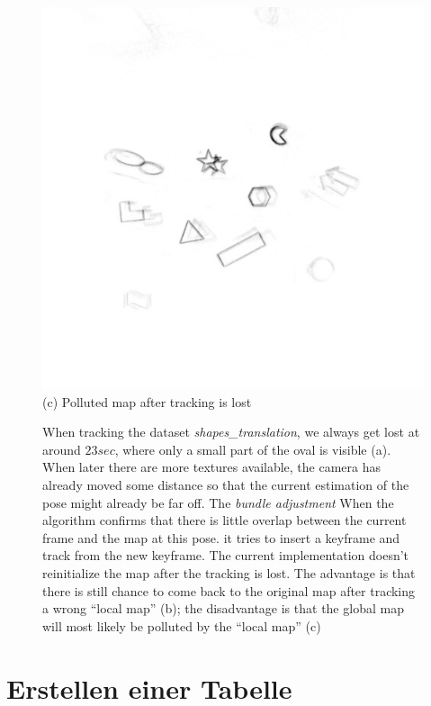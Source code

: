 \begin{figure}
   \begin{minipage}[t]{0.48\textwidth}
    \centering \includegraphics[width =
    \textwidth]{images/map_956.jpg}
     (c) Polluted map after tracking is lost
  \end{minipage} \caption{When tracking the dataset \textit{shapes\_translation}, we
    always get lost at around $23 sec$, where only a small part of the
    oval is visible (a). When later there are more textures available,
    the camera has already moved some distance so that the current
    estimation of the pose might already be far off. The \textit{bundle adjustment }When the
    algorithm confirms that there is little overlap between the
    current frame and the map at this pose. it tries to insert a
    keyframe and track from the new keyframe. The current
    implementation doesn't reinitialize the map after the tracking is
    lost. The advantage is that there is still chance to come back to
    the original map after tracking a wrong ``local map'' (b); the
    disadvantage is that the global map will most likely be polluted
    by the ``local map'' (c)}
  \label{fig:shapes_tr_lost}
\end{figure}



\section{Erstellen einer Tabelle}\label{sec:tabellen}


